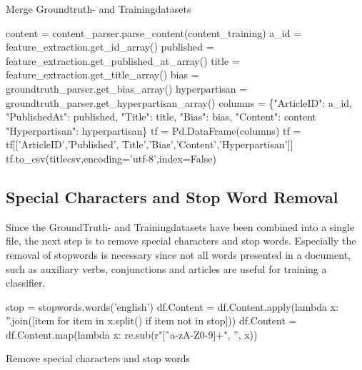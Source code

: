 \documentclass[a4paper, 11pt,titlepage,oneside,openany]{book}
\begin{document}
\begin{algorithm}[H]
	\DontPrintSemicolon
	\caption{Merge Groundtruth- and Trainingdatasets}
	content = content\_parser.parse\_content(content\_training)\;
	a\_id = feature\_extraction.get\_id\_array()\;
	\BlankLine
	\BlankLine
	published = feature\_extraction.get\_published\_at\_array()\;
	title = feature\_extraction.get\_title\_array()\;
	bias = groundtruth\_parser.get\_bias\_array()\;
	hyperpartisan = groundtruth\_parser.get\_hyperpartisan\_array()\;
	\BlankLine
	columns = \{"ArticleID": a\_id, "PublishedAt": published, "Title": title, "Bias": bias, "Content": content  "Hyperpartisan": hyperpartisan\}\;
	\BlankLine
	\BlankLine
	tf = Pd.DataFrame(columns)\;
	tf = tf[['ArticleID','Published', Title','Bias','Content','Hyperpartisan']]\;
	tf.to\_csv(titlecsv,encoding='utf-8',index=False)\;
\end{algorithm}

\subsection{Special Characters and Stop Word Removal}
Since the GroundTruth- and Trainingdatasets have been combined into a single file, the next step  is to remove special characters and stop words. Especially the removal of stopwords is necessary since not all words presented in a document, such as auxiliary verbs, conjunctions and articles \cite{textclassification} are useful for training a classifier.\\

\begin{algorithm}[H]
		\DontPrintSemicolon
	stop = stopwords.words('english')\;
	\BlankLine
	\BlankLine
	df.Content = df.Content.apply(lambda x: ''.join([item for item in x.split() if item not in stop]))\;
	df.Content = df.Content.map(lambda x: re.sub(r"[\^\ a-zA-Z0-9]+", '', x))\;
	\caption{Remove special characters and stop words}
\end{algorithm}
\end{document}
